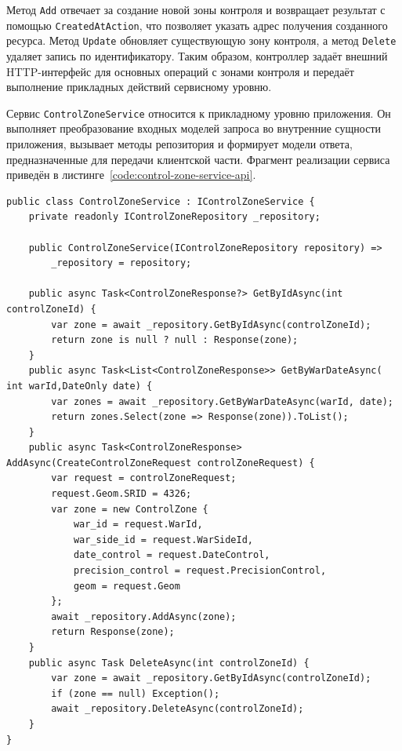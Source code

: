 Метод \texttt{Add} отвечает за создание новой зоны контроля и возвращает результат с помощью \texttt{CreatedAtAction}, что позволяет указать адрес получения созданного ресурса. Метод \texttt{Update} обновляет существующую зону контроля, а метод \texttt{Delete} удаляет запись по идентификатору. Таким образом, контроллер задаёт внешний HTTP-интерфейс для основных операций с зонами контроля и передаёт выполнение прикладных действий сервисному уровню.

Сервис \texttt{ControlZoneService} относится к прикладному уровню приложения. Он выполняет преобразование входных моделей запроса во внутренние сущности приложения, вызывает методы репозитория и формирует модели ответа, предназначенные для передачи клиентской части. Фрагмент реализации сервиса приведён в листинге~\ref{code:control-zone-service-api}.

\begin{code}
\label{code:control-zone-service-api}
\vspace{-0.75cm}
\begin{verbatim}
public class ControlZoneService : IControlZoneService {
    private readonly IControlZoneRepository _repository;

    public ControlZoneService(IControlZoneRepository repository) =>
        _repository = repository;

    public async Task<ControlZoneResponse?> GetByIdAsync(int controlZoneId) {
        var zone = await _repository.GetByIdAsync(controlZoneId);
        return zone is null ? null : Response(zone);
    }
    public async Task<List<ControlZoneResponse>> GetByWarDateAsync( int warId,DateOnly date) {
        var zones = await _repository.GetByWarDateAsync(warId, date);
        return zones.Select(zone => Response(zone)).ToList();
    }
    public async Task<ControlZoneResponse> AddAsync(CreateControlZoneRequest controlZoneRequest) {
        var request = controlZoneRequest;
        request.Geom.SRID = 4326;
        var zone = new ControlZone {
            war_id = request.WarId,
            war_side_id = request.WarSideId,
            date_control = request.DateControl,
            precision_control = request.PrecisionControl,
            geom = request.Geom
        };
        await _repository.AddAsync(zone);
        return Response(zone);
    }
    public async Task DeleteAsync(int controlZoneId) {
        var zone = await _repository.GetByIdAsync(controlZoneId);
        if (zone == null) Exception();
        await _repository.DeleteAsync(controlZoneId);
    }
}
\end{verbatim}
\end{code}

